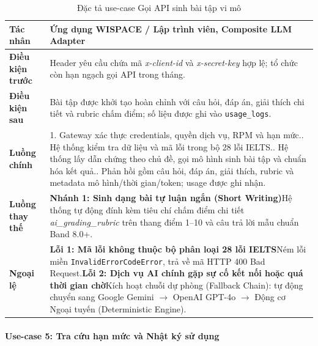 \begingroup
\small
\begin{longtable}{|p{3.2cm}|p{\dimexpr\linewidth-3.2cm-4\tabcolsep-3\arrayrulewidth\relax}|}
\caption{Đặc tả use-case Gọi API sinh bài tập vi mô}
\label{aihub:tab:uc_create_exercise}\\
\hline
\textbf{Tác nhân} & Ứng dụng WISPACE / Lập trình viên, Composite LLM Adapter \\ \hline
\textbf{Điều kiện trước} & Header yêu cầu chứa mã \textit{x-client-id} và \textit{x-secret-key} hợp lệ; tổ chức còn hạn ngạch gọi API trong tháng. \\ \hline
\textbf{Điều kiện sau} & Bài tập được khởi tạo hoàn chỉnh với câu hỏi, đáp án, giải thích chi tiết và rubric chấm điểm; số liệu được ghi vào \texttt{usage\_logs}. \\ \hline
\textbf{Luồng chính} & 1. Gateway xác thực credentials, quyền dịch vụ, RPM và hạn mức.\newline 2. Hệ thống kiểm tra dữ liệu và mã lỗi trong bộ 28 lỗi IELTS.\newline 3. Hệ thống lấy dẫn chứng theo chủ đề, gọi mô hình sinh bài tập và chuẩn hóa kết quả.\newline 4. Phản hồi gồm câu hỏi, đáp án, giải thích, rubric và metadata mô hình/thời gian/token; usage được ghi nhận. \\ \hline
\textbf{Luồng thay thế} &
\textbf{Nhánh 1: Sinh dạng bài tự luận ngắn (Short Writing)}\newline Hệ thống tự động đính kèm tiêu chí chấm điểm chi tiết \textit{ai\_grading\_rubric} trên thang điểm 1--10 và câu trả lời mẫu chuẩn Band 8.0+. \\ \hline
\textbf{Ngoại lệ} &
\textbf{Lỗi 1: Mã lỗi không thuộc bộ phân loại 28 lỗi IELTS}\newline Ném lỗi miền \texttt{InvalidErrorCodeError}, trả về mã HTTP 400 Bad Request.\newline \textbf{Lỗi 2: Dịch vụ AI chính gặp sự cố kết nối hoặc quá thời gian chờ}\newline Kích hoạt chuỗi dự phòng (Fallback Chain): tự động chuyển sang Google Gemini $\rightarrow$ OpenAI GPT-4o $\rightarrow$ Động cơ Ngoại tuyến (Deterministic Engine). \\ \hline
\end{longtable}
\endgroup

\paragraph{Use-case 5: Tra cứu hạn mức và Nhật ký sử dụng}

